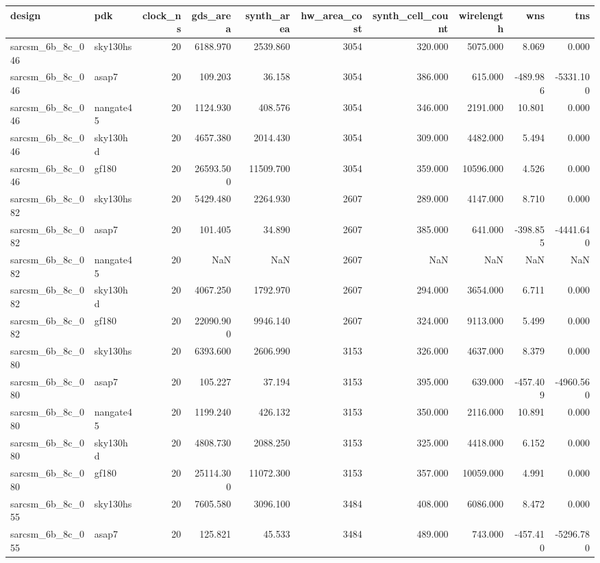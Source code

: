 \begin{tabular}{llrrrrrrrr}
\toprule
design & pdk & clock\_ns & gds\_area & synth\_area & hw\_area\_cost & synth\_cell\_count & wirelength & wns & tns \\
\midrule
sarcsm\_6b\_8c\_046 & sky130hs & 20 & 6188.970 & 2539.860 & 3054 & 320.000 & 5075.000 & 8.069 & 0.000 \\
sarcsm\_6b\_8c\_046 & asap7 & 20 & 109.203 & 36.158 & 3054 & 386.000 & 615.000 & -489.986 & -5331.100 \\
sarcsm\_6b\_8c\_046 & nangate45 & 20 & 1124.930 & 408.576 & 3054 & 346.000 & 2191.000 & 10.801 & 0.000 \\
sarcsm\_6b\_8c\_046 & sky130hd & 20 & 4657.380 & 2014.430 & 3054 & 309.000 & 4482.000 & 5.494 & 0.000 \\
sarcsm\_6b\_8c\_046 & gf180 & 20 & 26593.500 & 11509.700 & 3054 & 359.000 & 10596.000 & 4.526 & 0.000 \\
sarcsm\_6b\_8c\_082 & sky130hs & 20 & 5429.480 & 2264.930 & 2607 & 289.000 & 4147.000 & 8.710 & 0.000 \\
sarcsm\_6b\_8c\_082 & asap7 & 20 & 101.405 & 34.890 & 2607 & 385.000 & 641.000 & -398.855 & -4441.640 \\
sarcsm\_6b\_8c\_082 & nangate45 & 20 & NaN & NaN & 2607 & NaN & NaN & NaN & NaN \\
sarcsm\_6b\_8c\_082 & sky130hd & 20 & 4067.250 & 1792.970 & 2607 & 294.000 & 3654.000 & 6.711 & 0.000 \\
sarcsm\_6b\_8c\_082 & gf180 & 20 & 22090.900 & 9946.140 & 2607 & 324.000 & 9113.000 & 5.499 & 0.000 \\
sarcsm\_6b\_8c\_080 & sky130hs & 20 & 6393.600 & 2606.990 & 3153 & 326.000 & 4637.000 & 8.379 & 0.000 \\
sarcsm\_6b\_8c\_080 & asap7 & 20 & 105.227 & 37.194 & 3153 & 395.000 & 639.000 & -457.409 & -4960.560 \\
sarcsm\_6b\_8c\_080 & nangate45 & 20 & 1199.240 & 426.132 & 3153 & 350.000 & 2116.000 & 10.891 & 0.000 \\
sarcsm\_6b\_8c\_080 & sky130hd & 20 & 4808.730 & 2088.250 & 3153 & 325.000 & 4418.000 & 6.152 & 0.000 \\
sarcsm\_6b\_8c\_080 & gf180 & 20 & 25114.300 & 11072.300 & 3153 & 357.000 & 10059.000 & 4.991 & 0.000 \\
sarcsm\_6b\_8c\_055 & sky130hs & 20 & 7605.580 & 3096.100 & 3484 & 408.000 & 6086.000 & 8.472 & 0.000 \\
sarcsm\_6b\_8c\_055 & asap7 & 20 & 125.821 & 45.533 & 3484 & 489.000 & 743.000 & -457.410 & -5296.780 \\

\end{tabular}
